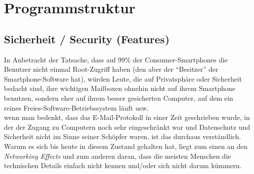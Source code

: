 \documentclass[a4paper,11pt]{article}
\begin{document}
\section{Programmstruktur}

\subsection{Sicherheit / Security (Features)}
In Anbetracht der Tatsache, dass auf 99\% der Consumer-Smartphones die Benutzer nicht einmal Root-Zugriff haben (den aber der ``Besitzer'' der Smartphone-Software hat), würden Leute, die auf Privatsphäre oder Sicherheit bedacht sind, ihre wichtigen Mailboxen ohnehin nicht auf ihrem Smartphone benutzen, sondern eher auf ihrem besser gesicherten Computer, auf dem ein reines Freies-Software-Betriebssystem läuft usw.\\

wenn man bedenkt, dass das E-Mail-Protokoll in einer Zeit geschrieben wurde, in der der Zugang zu Computern noch sehr eingeschränkt war und Datenschutz und Sicherheit nicht im Sinne seiner Schöpfer waren, ist das durchaus verständlich. Warum es sich bis heute in diesem Zustand gehalten hat, liegt zum einen an den \textit{Networking Effects} und zum anderen daran, dass die meisten Menschen die technischen Details einfach nicht kennen und/oder sich nicht darum kümmern.\\
\end{document}
